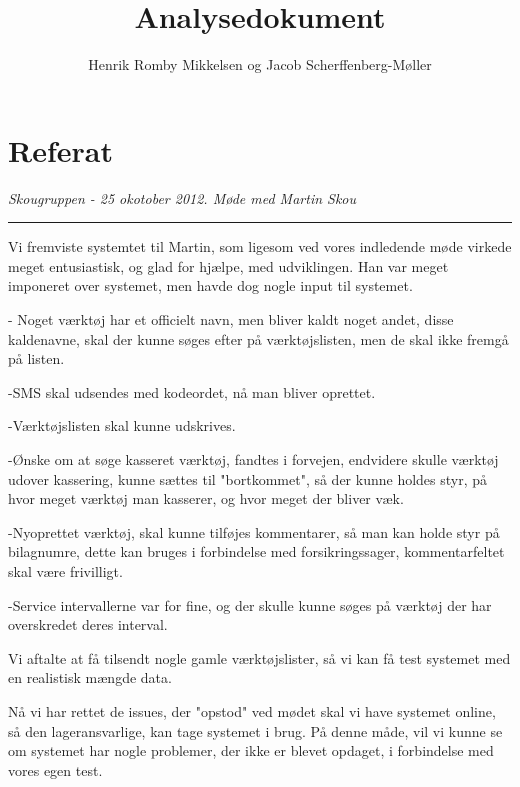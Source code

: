 \documentclass{article}
\title{Analysedokument}
\author{Henrik Romby Mikkelsen og Jacob Scherffenberg-Møller}
\begin{document}
\maketitle
\tableofcontents
\pagebreak

\section{Referat}
\emph{Skougruppen - 25 okotober 2012. Møde med Martin Skou}
\hrule

Vi fremviste systemtet til Martin, som ligesom ved vores indledende møde virkede meget entusiastisk, og glad for hjælpe, med udviklingen. 
Han var meget imponeret over systemet, men havde dog nogle input til systemet. 

- Noget værktøj har et officielt navn, men bliver kaldt noget andet, disse kaldenavne, skal der kunne søges efter på værktøjslisten, men de skal ikke fremgå på listen. 

-SMS skal udsendes med kodeordet, nå man bliver oprettet.

-Værktøjslisten skal kunne udskrives.

-Ønske om at søge kasseret værktøj, fandtes i forvejen, endvidere skulle værktøj udover kassering, kunne sættes til "bortkommet", så der kunne holdes styr, på hvor meget værktøj man kasserer, og hvor meget der bliver væk.

-Nyoprettet værktøj, skal kunne tilføjes kommentarer, så man kan holde styr på bilagnumre, dette kan bruges i forbindelse med forsikringssager, kommentarfeltet skal være frivilligt. 

-Service intervallerne var for fine, og der skulle kunne søges på værktøj der har overskredet deres interval.

Vi aftalte at få tilsendt nogle gamle værktøjslister, så vi kan få test systemet med en realistisk mængde data.

Nå vi har rettet de issues, der "opstod" ved mødet skal vi have systemet online, så den lageransvarlige, kan tage systemet i brug. På denne måde, vil vi kunne se om systemet har nogle problemer, der ikke er blevet opdaget, i forbindelse med vores egen test.  
\end{document}

